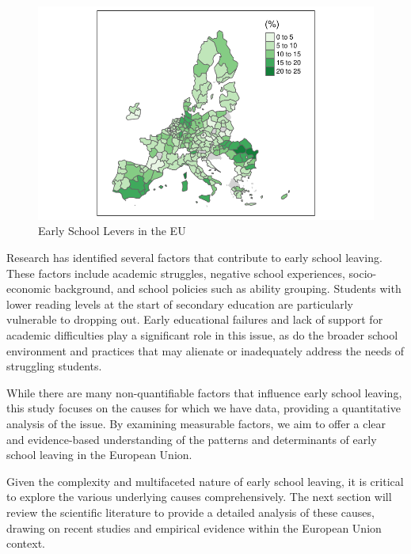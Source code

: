 \documentclass[
  letterpaper,
  DIV=11,
  numbers=noendperiod,
  abstract]{scrartcl}
\begin{document}
\begin{figure}[H]

{\centering \includegraphics[width=1\textwidth,height=\textheight]{report_files/figure-pdf/mappa esl-1.pdf}

}

\caption{Early School Levers in the EU}

\end{figure}%

Research has identified several factors that contribute to early school
leaving. These factors include academic struggles, negative school
experiences, socio-economic background, and school policies such as
ability grouping. Students with lower reading levels at the start of
secondary education are particularly vulnerable to dropping out. Early
educational failures and lack of support for academic difficulties play
a significant role in this issue, as do the broader school environment
and practices that may alienate or inadequately address the needs of
struggling students.

While there are many non-quantifiable factors that influence early
school leaving, this study focuses on the causes for which we have data,
providing a quantitative analysis of the issue. By examining measurable
factors, we aim to offer a clear and evidence-based understanding of the
patterns and determinants of early school leaving in the European Union.

Given the complexity and multifaceted nature of early school leaving, it
is critical to explore the various underlying causes comprehensively.
The next section will review the scientific literature to provide a
detailed analysis of these causes, drawing on recent studies and
empirical evidence within the European Union context.
\end{document}
